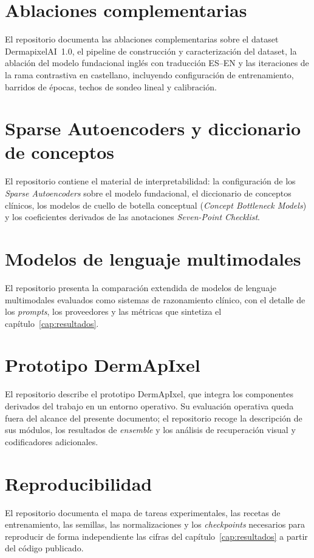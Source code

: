 \section{Ablaciones complementarias}
\label{sec:repo-ablaciones}

El repositorio documenta las ablaciones complementarias sobre el
dataset DermapixelAI~1.0, el pipeline de construcción y
caracterización del dataset, la ablación del modelo fundacional
inglés con traducción ES--EN y las iteraciones de la rama
contrastiva en castellano, incluyendo configuración de
entrenamiento, barridos de épocas, techos de sondeo lineal y
calibración.

\section{Sparse Autoencoders y diccionario de conceptos}
\label{sec:repo-sae}

El repositorio contiene el material de interpretabilidad: la
configuración de los \emph{Sparse Autoencoders} sobre el modelo
fundacional, el diccionario de conceptos clínicos, los modelos de
cuello de botella conceptual (\emph{Concept Bottleneck Models}) y
los coeficientes derivados de las anotaciones \emph{Seven-Point
Checklist}.

\section{Modelos de lenguaje multimodales}
\label{sec:repo-llm}

El repositorio presenta la comparación extendida de modelos de
lenguaje multimodales evaluados como sistemas de razonamiento
clínico, con el detalle de los \emph{prompts}, los proveedores y las
métricas que sintetiza el capítulo~\ref{cap:resultados}.

\section{Prototipo DermApIxel}
\label{sec:repo-prototipo}

El repositorio describe el prototipo DermApIxel, que integra los
componentes derivados del trabajo en un entorno operativo. Su
evaluación operativa queda fuera del alcance del presente documento;
el repositorio recoge la descripción de sus módulos, los resultados
de \emph{ensemble} y los análisis de recuperación visual y
codificadores adicionales.

\section{Reproducibilidad}
\label{sec:repo-reproducibilidad}

El repositorio documenta el mapa de tareas experimentales, las
recetas de entrenamiento, las semillas, las normalizaciones y los
\emph{checkpoints} necesarios para reproducir de forma independiente
las cifras del capítulo~\ref{cap:resultados} a partir del código
publicado.
